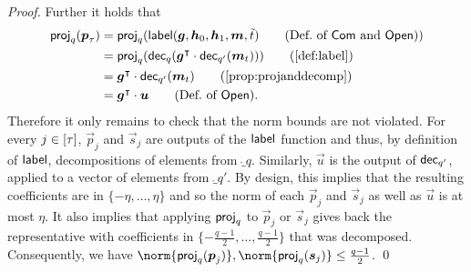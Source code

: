 \begin{proof}
Further it holds that
\begin{align*}
  \proj_q(\vec{p}_{\tau})
  ={}&\proj_q(\lbl(\vec{g},\vec{h}_0,\vec{h}_1,\vec{m},\tilde t)\tag{Def.\ of $\commit$ and $\open$})\\
  ={}&\proj_q(\decomp_q(\vec{g}^\transpose\cdot \decomp_{q'}(\vec{m}_t)))\tag{\autoref{def:label}}\\
  ={}&\vec{g}^\transpose\cdot \decomp_{q'}(\vec{m}_t)\tag{\autoref{prop:projanddecomp}}\\
  ={}&\vec{g}^\transpose\cdot\vec{u}\tag{Def.\ of $\open$}.
\end{align*}
%
Therefore it only remains to check that the norm bounds are not violated.
For every $j\in[\tau]$, $\vec{p}_j$ and $\vec{s}_j$ are outputs of the $\mathsf{label}$ function and thus, by definition of $\mathsf{label}$, decompositions of elements from $\ring_q$.
Similarly, $\vec{u}$ is the output of $\mathsf{dec}_{q'}$, applied to a vector of elements from $\ring_{q'}$.
By design, this implies that the resulting coefficients are in $\{-\eta,\dots,\eta\}$ and so the norm of each $\vec{p}_j$ and $\vec{s}_j$ as well as $\vec{u}$ is at most $\eta$.
It also implies that applying $\mathsf{proj}_q$ to $\vec{p}_j$ or $\vec{s}_j$ gives back the representative with coefficients in $\{-\tfrac{q-1}{2},\ldots,\tfrac{q-1}{2}\}$ that was decomposed.
Consequently, we have $\norm{\proj_q(\vec{p}_j)}, \norm{\proj_q(\vec{s}_j)} \leq \tfrac{q-1}{2}$.
\qed
\end{proof}

